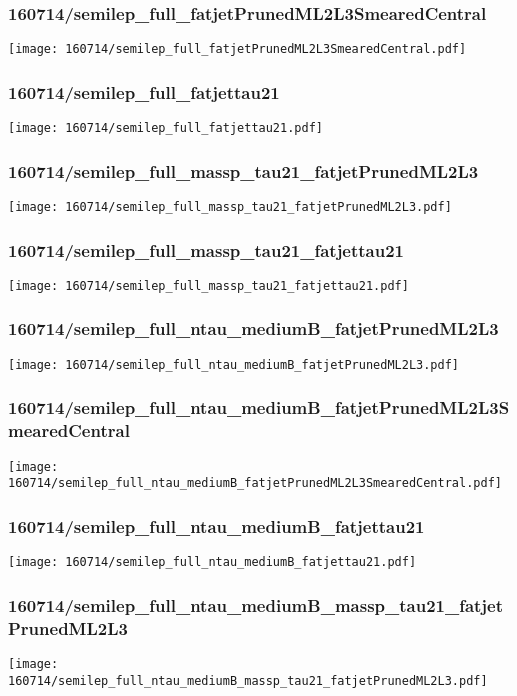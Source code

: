 \begin{frame}
   \frametitle{\small 160714/semilep\_full\_fatjetPrunedML2L3SmearedCentral}
   \centering
   \texttt{[image: 160714/semilep\_full\_fatjetPrunedML2L3SmearedCentral.pdf]}
\end{frame}

\begin{frame}
   \frametitle{\small 160714/semilep\_full\_fatjettau21}
   \centering
   \texttt{[image: 160714/semilep\_full\_fatjettau21.pdf]}
\end{frame}

\begin{frame}
   \frametitle{\small 160714/semilep\_full\_massp\_tau21\_fatjetPrunedML2L3}
   \centering
   \texttt{[image: 160714/semilep\_full\_massp\_tau21\_fatjetPrunedML2L3.pdf]}
\end{frame}

\begin{frame}
   \frametitle{\small 160714/semilep\_full\_massp\_tau21\_fatjettau21}
   \centering
   \texttt{[image: 160714/semilep\_full\_massp\_tau21\_fatjettau21.pdf]}
\end{frame}

\begin{frame}
   \frametitle{\small 160714/semilep\_full\_ntau\_mediumB\_fatjetPrunedML2L3}
   \centering
   \texttt{[image: 160714/semilep\_full\_ntau\_mediumB\_fatjetPrunedML2L3.pdf]}
\end{frame}

\begin{frame}
   \frametitle{\small 160714/semilep\_full\_ntau\_mediumB\_fatjetPrunedML2L3SmearedCentral}
   \centering
   \texttt{[image: 160714/semilep\_full\_ntau\_mediumB\_fatjetPrunedML2L3SmearedCentral.pdf]}
\end{frame}

\begin{frame}
   \frametitle{\small 160714/semilep\_full\_ntau\_mediumB\_fatjettau21}
   \centering
   \texttt{[image: 160714/semilep\_full\_ntau\_mediumB\_fatjettau21.pdf]}
\end{frame}

\begin{frame}
   \frametitle{\small 160714/semilep\_full\_ntau\_mediumB\_massp\_tau21\_fatjetPrunedML2L3}
   \centering
   \texttt{[image: 160714/semilep\_full\_ntau\_mediumB\_massp\_tau21\_fatjetPrunedML2L3.pdf]}
\end{frame}

